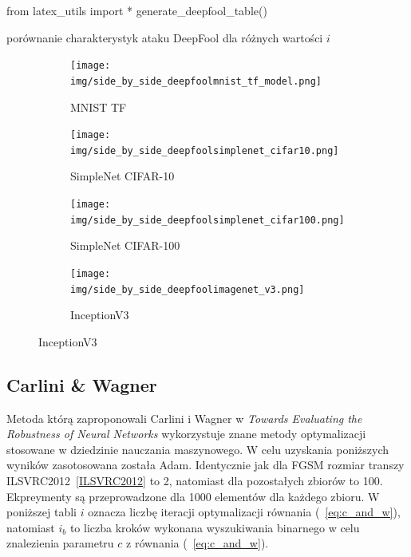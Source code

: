 \documentclass[
    left=2.5cm,         %
    right=2.5cm,        %
    top=2.5cm,          %
    bottom=3cm,         %
    bindingoffset=6mm,  %
    nohyphenation=false %
]{eiti/eiti-thesis}
\begin{document}
\begin{table}[h]
\begin{adjustbox}{max width=\textwidth}
\begin{pycode}
from latex_utils import *
generate_deepfool_table()
\end{pycode}
\end{adjustbox}
\caption{porównanie charakterystyk ataku DeepFool dla różnych wartości \(i\)}
\end{table}

\begin{figure}[H]
    \caption{Przykłady wygenerowanych złośliwych za pomocą metody DeepFool}

    \begin{subfigure}[t]{0.48\textwidth}
        \texttt{[image: img/side\_by\_side\_deepfoolmnist\_tf\_model.png]}
        \caption{MNIST TF}
        \label{fig:mnist_side_deepfool}
    \end{subfigure}%
    \hfill
    \begin{subfigure}[t]{0.48\textwidth}
        \texttt{[image: img/side\_by\_side\_deepfoolsimplenet\_cifar10.png]}
        \caption{SimpleNet CIFAR-10}
        \label{fig:cifar10_side_deepfool}
    \end{subfigure}%

    \begin{subfigure}[t]{0.48\textwidth}
        \texttt{[image: img/side\_by\_side\_deepfoolsimplenet\_cifar100.png]}
        \caption{SimpleNet CIFAR-100}
        \label{fig:cifar100_side_deepfool}
    \end{subfigure}%
    \hfill
    \begin{subfigure}[t]{0.48\textwidth}
        \texttt{[image: img/side\_by\_side\_deepfoolimagenet\_v3.png]}
        \caption{InceptionV3}
        \label{fig:imagenet_side_deepfool}
    \end{subfigure}%

\end{figure}

\subsection{Carlini \& Wagner}
Metoda którą zaproponowali Carlini i Wagner w \textit{Towards Evaluating the Robustness of Neural Networks}\cite{DBLP:journals/corr/CarliniW16a}
wykorzystuje znane metody optymalizacji stosowane w dziedzinie nauczania maszynowego. W celu uzyskania poniższych wyników zasotosowana została
Adam\cite{DBLP:journals/corr/KingmaB14}. Identycznie jak dla FGSM rozmiar transzy ILSVRC2012~\ref{ILSVRC2012} to 2, natomiast dla pozostałych zbiorów to 100.
Ekpreymenty są przeprowadzone dla 1000 elementów dla każdego zbioru. W poniższej tabli $i$ oznacza liczbę iteracji optymalizacji równania (~\ref{eq:c_and_w}),
natomiast $i_b$ to liczba kroków wykonana wyszukiwania binarnego w celu znalezienia parametru $c$ z równania (~\ref{eq:c_and_w}).
\end{document}
